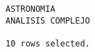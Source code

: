 \documentclass[11pt]{report}
\begin{document}
\begin{itemize}
\begin{verbatim}
ASTRONOMIA                                                                                                                                                                                                                                                                                                                                                                                                                                                                                                          
ANALISIS COMPLEJO                                                                                                                                                                                                                                                                                                                                                                                                                                                                                                   

10 rows selected.
  \end{verbatim}
\end{itemize}
\end{document}
